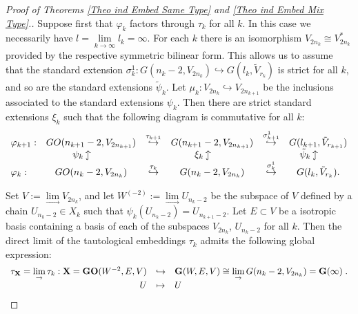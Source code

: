 \documentclass[12pt]{amsart}
\def\hw  {\hookrightarrow}
\newcommand{\huw}{\mathrel{\rotatebox[origin=c]{90}{$\hookrightarrow$}}}
\begin{document}
\begin{proof}[Proof of Theorems \ref{Theo ind Embed Same Type} and \ref{Theo ind Embed Mix Type}.]
Suppose first that $\varphi_k$ factors through $\tau_k$ for all $k$. In this case we necessarily have $l=\lim\limits_{k\to\infty} l_k=\infty$. For each $k$ there is an isomorphism $V_{2n_k}\cong V_{2n_k}^*$ provided by the respective symmetric bilinear form. This allows us to assume that the standard extension $\sigma^1_k: G(n_k-2,V_{2n_k})\hw G(l_k,\tilde V_{r_k})$ is strict for all $k$, and so are the standard extensions $\tilde\psi_k$. Let $\mu_k:V_{2n_k}\hw V_{2n_{k+1}}$ be the inclusions associated to the standard extensions $\psi_k$. Then there are strict standard extensions $\xi_k$ such that the following diagram is commutative for all $k$: 
\begin{gather*}
\begin{array}{lccccc}
\varphi_{k+1}: & GO(n_{k+1}-2,V_{2n_{k+1}}) & \stackrel{\tau_{k+1}}{\hw} & G(n_{k+1}-2,V_{2n_{k+1}}) & \stackrel{\sigma^1_{k+1}}{\hw} & G(l_{k+1},\tilde V_{r_{k+1}}) \\
 & \psi_k \huw \qquad & & \xi_k \huw \qquad & & \tilde\psi_k \huw \qquad \\
\varphi_k: & GO(n_{k}-2,V_{2n_{k}}) & \stackrel{\tau_{k}}{\hw} & G(n_{k}-2,V_{2n_k}) & \stackrel{\sigma^1_{k}}{\hw} & G(l_{k},\tilde V_{r_{k}}).
\end{array}
\end{gather*}

Set $V:=\lim\limits_\to V_{2n_k}$, and let $W^{(-2)}:=\lim\limits_\to U_{n_k-2}$ be the subspace of $V$ defined by a chain $U_{n_k-2}\in X_k$ such that $\psi_k(U_{n_k-2})=U_{n_{k+1}-2}$. Let $E\subset V$ be a isotropic basis containing a basis of each of the subspaces $V_{2n_k}$, $U_{n_k-2}$ for all $k$. Then the direct limit of the tautological embeddings $\tau_k$ admits the following global expression:
\begin{gather*}
\begin{array}{rcl}
\tau_{\bf X}=\lim\limits_\to\tau_k:{\bf X}= {\bf GO}(W^{-2},E,V) & \hw & {\bf G}(W,E,V) \cong \lim\limits_\to G(n_k-2,V_{2n_k}) = {\bf G}(\infty) \;. \\
 U & \mapsto & U
\end{array}
\end{gather*}


\end{proof}
\end{document}
